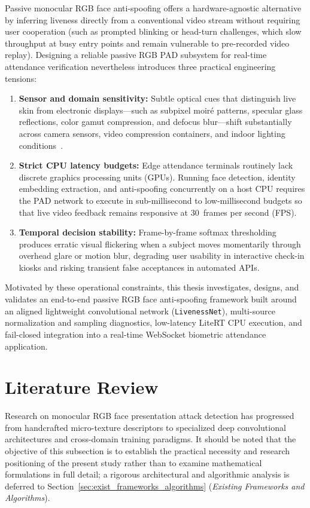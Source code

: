 Passive monocular RGB face anti-spoofing offers a hardware-agnostic alternative by inferring liveness directly from a conventional video stream without requiring user cooperation (such as prompted blinking or head-turn challenges, which slow throughput at busy entry points and remain vulnerable to pre-recorded video replay). Designing a reliable passive RGB PAD subsystem for real-time attendance verification nevertheless introduces three practical engineering tensions:
\begin{enumerate}
    \item \textbf{Sensor and domain sensitivity:} Subtle optical cues that distinguish live skin from electronic displays---such as subpixel moir\'{e} patterns, specular glass reflections, color gamut compression, and defocus blur---shift substantially across camera sensors, video compression containers, and indoor lighting conditions~\cite{wen2015face, jia2020single}.
    \item \textbf{Strict CPU latency budgets:} Edge attendance terminals routinely lack discrete graphics processing units (GPUs). Running face detection, identity embedding extraction, and anti-spoofing concurrently on a host CPU requires the PAD network to execute in sub-millisecond to low-millisecond budgets so that live video feedback remains responsive at $30$~frames per second (FPS).
    \item \textbf{Temporal decision stability:} Frame-by-frame softmax thresholding produces erratic visual flickering when a subject moves momentarily through overhead glare or motion blur, degrading user usability in interactive check-in kiosks and risking transient false acceptances in automated APIs.
\end{enumerate}

Motivated by these operational constraints, this thesis investigates, designs, and validates an end-to-end passive RGB face anti-spoofing framework built around an aligned lightweight convolutional network (\texttt{LivenessNet}), multi-source normalization and sampling diagnostics, low-latency LiteRT CPU execution, and fail-closed integration into a real-time WebSocket biometric attendance application.

\section{Literature Review}
\label{sec:literature_review}

Research on monocular RGB face presentation attack detection has progressed from handcrafted micro-texture descriptors to specialized deep convolutional architectures and cross-domain training paradigms. It should be noted that the objective of this subsection is to establish the practical necessity and research positioning of the present study rather than to examine mathematical formulations in full detail; a rigorous architectural and algorithmic analysis is deferred to Section~\ref{sec:exist_frameworks_algorithms} (\emph{Existing Frameworks and Algorithms}).

